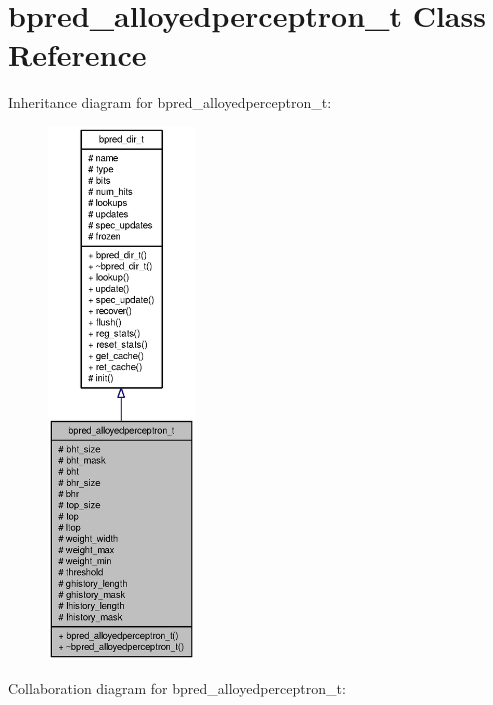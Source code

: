 \section{bpred\_\-alloyedperceptron\_\-t Class Reference}
\label{classbpred__alloyedperceptron__t}
Inheritance diagram for bpred\_\-alloyedperceptron\_\-t:\nopagebreak
\begin{figure}[H]
\begin{center}
\leavevmode
\includegraphics[height=400pt]{classbpred__alloyedperceptron__t__inherit__graph}
\end{center}
\end{figure}
Collaboration diagram for bpred\_\-alloyedperceptron\_\-t:\nopagebreak
